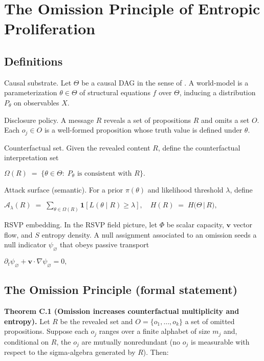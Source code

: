 \documentclass[12pt,a4paper]{article}
\begin{document}
\section{The Omission Principle of Entropic Proliferation}

\subsection{Definitions}

Causal substrate. Let $\Theta$ be a causal DAG in the sense of \citet{Pearl2009}. A world-model is a parameterization $\theta \in \Theta$ of structural equations $f$ over $\Theta$, inducing a distribution $P_\theta$ on observables $X$.

Disclosure policy. A message $R$ reveals a set of propositions $R$ and omits a set $O$. Each $o_j \in O$ is a well-formed proposition whose truth value is defined under $\theta$.

Counterfactual set. Given the revealed content $R$, define the counterfactual interpretation set

$\Omega(R)\;=\;\{\theta\in\Theta:\; P_\theta \text{ is consistent with }R\}.$

Attack surface (semantic). For a prior $\pi(\theta)$ and likelihood threshold $\lambda$, define

$\mathcal{A}_\lambda(R)\;=\;\sum_{\theta\in\Omega(R)}\mathbf{1}\!\left[L(\theta\mid R)\ge \lambda\right],
\quad
H(R)\;=\;H\big(\Theta\,\big|\,R\big),$

RSVP embedding. In the RSVP field picture, let $\Phi$ be scalar capacity, $\mathbf{v}$ vector flow, and $S$ entropy density. A null assignment associated to an omission seeds a null indicator $\psi_{\varnothing}$ that obeys passive transport

$\partial_t \psi_{\varnothing}+\mathbf v\cdot\nabla\psi_{\varnothing}=0,$

\subsection{The Omission Principle (formal statement)}

\textbf{Theorem C.1 (Omission increases counterfactual multiplicity and entropy).} Let $R$ be the revealed set and $O = \{o_1, \dots, o_k\}$ a set of omitted propositions. Suppose each $o_j$ ranges over a finite alphabet of size $m_j$ and, conditional on $R$, the $o_j$ are mutually nonredundant (no $o_j$ is measurable with respect to the sigma-algebra generated by $R$). Then:
\end{document}
